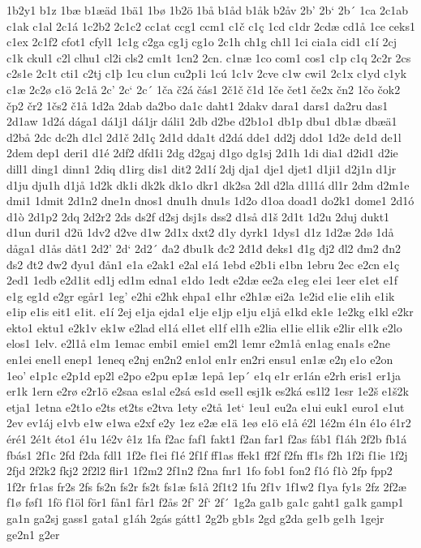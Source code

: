 1b2y1
b1z
1bæ
b1æäd
1bä1
1bø
1b2ö
1bå
b1åd
b1åk
b2åv
2b'
2b`
2b´
1ca
2c1ab
c1ak
c1al
2c1á
1c2b2
2c1c2
cc1at
ccg1
ccm1
c1č
c1ç
1cd
c1dr
2cdæ
cd1å
1ce
ceks1
c1ex
2c1f2
cfot1
cfyl1
1c1g
c2ga
cg1j
cg1o
2c1h
ch1g
ch1l
1ci
cia1a
cid1
c1í
2cj
c1k
ckul1
c2l
clhu1
cl2i
cls2
cm1t
1cn2
2cn.
c1næ
1co
com1
cos1
c1p
c1q
2c2r
2cs
c2s1e
2c1t
cti1
c2tj
c1þ
1cu
c1un
cu2p1i
1cú
1c1v
2cve
c1w
cwi1
2c1x
c1yd
c1yk
c1æ
2c2ø
c1ö
2c1å
2c'
2c`
2c´
1ča
č2á
čás1
2č1č
č1d
1če
čet1
če2x
čn2
1čo
čok2
čp2
čr2
1čs2
č1å
1d2a
2dab
da2bo
da1c
daht1
2dakv
dara1
dars1
da2ru
das1
2d1aw
1d2á
dága1
dá1j1
dá1jr
dáli1
2db
d2be
d2b1o1
db1p
dbu1
db1æ
dbæä1
d2bå
2dc
dc2h
d1cl
2d1č
2d1ç
2d1d
dda1t
d2dá
dde1
dd2j
ddo1
1d2e
de1d
de1l
2dem
dep1
deri1
d1é
2df2
dfd1i
2dg
d2gaj
d1go
dg1sj
2d1h
1di
dia1
d2id1
d2ie
dill1
ding1
dinn1
2diq
d1irg
dis1
dit2
2d1í
2dj
dja1
dje1
djet1
d1ji1
d2j1n
d1jr
d1ju
dju1h
d1jå
1d2k
dk1i
dk2k
dk1o
dkr1
dk2sa
2dl
d2la
d1l1á
dl1r
2dm
d2m1e
dmi1
1dmit
2d1n2
dne1n
dnos1
dnu1h
dnu1s
1d2o
d1oa
doad1
do2k1
dome1
2d1ó
d1ò
2d1p2
2dq
2d2r2
2ds
ds2f
d2sj
dsj1s
dss2
d1så
d1š
2d1t
1d2u
2duj
dukt1
d1un
duri1
d2ü
1dv2
d2ve
d1w
2d1x
dxt2
d1y
dyrk1
1dys1
d1z
1d2æ
2dø
1då
dåga1
d1ås
dåt1
2d2'
2d`
2d2´
đa2
đbu1k
đc2
2đ1đ
đeks1
đ1g
đj2
đl2
đm2
đn2
đs2
đt2
đw2
đyu1
đån1
e1a
e2ak1
e2al
e1á
1ebd
e2b1i
e1bn
1ebru
2ec
e2cn
e1ç
2ed1
1edb
e2d1it
ed1j
ed1m
edna1
e1do
1edt
e2dæ
ee2a
e1eg
e1ei
1eer
e1et
e1f
e1g
eg1d
e2gr
egår1
1eg'
e2hi
e2hk
ehpa1
e1hr
e2h1æ
ei2a
1e2id
e1ie
e1ih
e1ik
e1ip
e1is
eit1
e1it.
e1í
2ej
e1ja
ejda1
e1je
e1jp
e1ju
e1jå
e1kd
ek1e
1e2kg
e1kl
e2kr
ekto1
ektu1
e2k1v
ek1w
e2lad
el1á
el1et
el1f
el1h
e2lia
el1ie
el1ik
e2lir
el1k
e2lo
elos1
1elv.
e2l1å
e1m
1emac
embi1
emie1
em2l
1emr
e2m1å
en1ag
ena1s
e2ne
en1ei
ene1l
enep1
1eneq
e2nj
en2n2
en1ol
en1r
en2ri
ensu1
en1æ
e2ŋ
e1o
e2on
1eo'
e1p1c
e2p1d
ep2l
e2po
e2pu
ep1æ
1epå
1ep´
e1q
e1r
er1án
e2rh
eris1
er1ja
er1k
1ern
e2rø
e2r1ö
e2saa
es1al
e2sá
es1d
ese1l
esj1k
es2ká
es1l2
1esr
1e2š
e1š2k
etja1
1etna
e2t1o
e2ts
et2ts
e2tva
1ety
e2tå
1et`
1eu1
eu2a
e1ui
euk1
euro1
e1ut
2ev
ev1áj
e1vb
e1w
e1wa
e2xf
e2y
1ez
e2æ
e1ä
1eø
e1ö
e1å
é2l
1é2m
é1n
é1o
é1r2
éré1
2é1t
éto1
é1u
1é2v
ê1z
1fa
f2ac
faf1
fakt1
f2an
far1
f2as
fáb1
f1áh
2f2b
fb1á
fbás1
2f1c
2fd
f2da
fdl1
1f2e
f1ei
f1é
2f1f
ff1as
ffek1
ff2f
f2fn
ff1s
f2h
1f2i
f1ie
1f2j
2fjd
2f2k2
fkj2
2f2l2
flir1
1f2m2
2f1n2
f2na
fnr1
1fo
fob1
fon2
f1ó
f1ò
2fp
fpp2
1f2r
fr1as
fr2s
2fs
fs2n
fs2r
fs2t
fs1æ
fs1å
2f1t2
1fu
2f1v
1f1w2
f1ya
fy1s
2fz
2f2æ
f1ø
føf1
1fö
f1öl
för1
fån1
får1
f2ås
2f'
2f`
2f´
1g2a
ga1b
ga1c
gaht1
ga1k
gamp1
ga1n
ga2sj
gass1
gata1
g1áh
2gás
gátt1
2g2b
gb1s
2gd
g2da
ge1b
ge1h
1gejr
ge2n1
g2er
